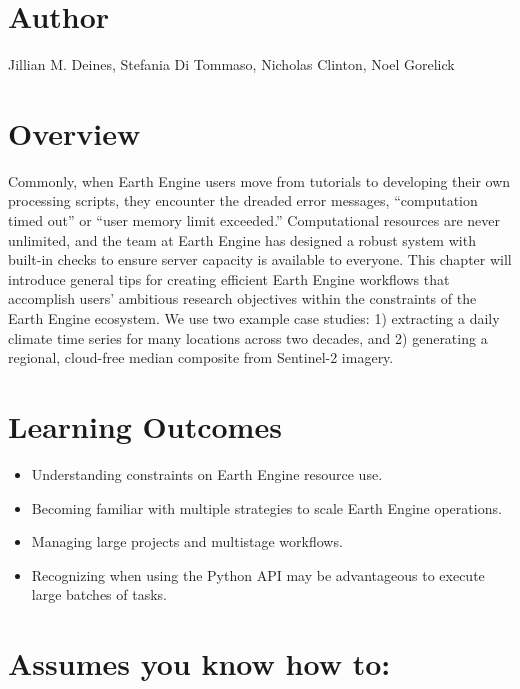 \documentclass[
  letterpaper,
  DIV=11,
  numbers=noendperiod]{scrreprt}
\providecommand{\tightlist}{%
  \setlength{\itemsep}{0pt}\setlength{\parskip}{0pt}}\usepackage{longtable,booktabs,array}
\begin{document}
\hypertarget{author-21}{%
\section*{Author}\label{author-21}}


Jillian M. Deines, Stefania Di Tommaso, Nicholas Clinton, Noel Gorelick
~ ~

\hypertarget{overview-22}{%
\section*{Overview}\label{overview-22}}


Commonly, when Earth Engine users move from tutorials to developing
their own processing scripts, they encounter the dreaded error messages,
``computation timed out'' or ``user memory limit exceeded.''
Computational resources are never unlimited, and the team at Earth
Engine has designed a robust system with built-in checks to ensure
server capacity is available to everyone. This chapter will introduce
general tips for creating efficient Earth Engine workflows that
accomplish users' ambitious research objectives within the constraints
of the Earth Engine ecosystem. We use two example case studies: 1)
extracting a daily climate time series for many locations across two
decades, and 2) generating a regional, cloud-free median composite from
Sentinel-2 imagery.

\hypertarget{learning-outcomes-22}{%
\section*{Learning Outcomes}\label{learning-outcomes-22}}


\begin{itemize}
\tightlist
\item
  Understanding constraints on Earth Engine resource use.
\item
  Becoming familiar with multiple strategies to scale Earth Engine
  operations.
\item
  Managing large projects and multistage workflows.
\item
  Recognizing when using the Python API may be advantageous to execute
  large batches of tasks.
\end{itemize}

\hypertarget{assumes-you-know-how-to-22}{%
\section*{Assumes you know how to:}\label{assumes-you-know-how-to-22}}
\end{document}
